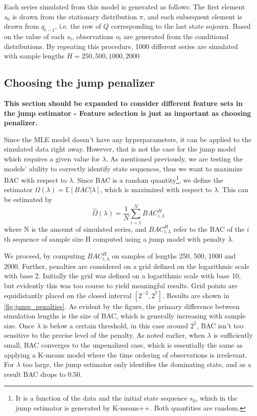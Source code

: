 Each series simulated from this model is generated as follows: The first element $s_0$ is drawn from the stationary distribution $\pi$, and each subsequent element is drawn from $q_{t-1}$, i.e. the row of $Q$ corresponding to the last state sojourn. Based on the value of each $s_t$, observations $o_t$ are generated from the conditional distributions. By repeating this procedure, 1000 different series are simulated with sample lengths $H = 250, 500, 1000, 2000$

\subsection{Choosing the jump penalizer}
\label{subsection: jump_penalizer}

\textbf{This section should be expanded to consider different feature sets in the jump estimator - Feature selection is just as important as choosing penalizer.}

Since the MLE model doesn't have any hyperparameters, it can be applied to the simulated data right away. However, that is not the case for the jump model which requires a given value for $\lambda$. As mentioned previously, we are testing the models' ability to correctly identify state sequences, thus we want to maximize BAC with respect to $\lambda$. Since BAC is a random quantity\footnote
{It is a function of the data and the initial state sequence $s_0$, which in the jump estimator is generated by K-means++. Both quantities are random.
},
we define the estimator $\Omega(\lambda)= \mathbb{E}[BAC|\lambda]$, which is maximized with respect to $\lambda$. This can be estimated by 
\begin{equation}
    \hat\Omega(\lambda) = \frac{1}{N} \sum_{i=1}^N BAC_{i, \lambda}^H
\end{equation}
where N is the amount of simulated series, and $BAC_{i, \lambda}^H$ refer to the BAC of the $i$th sequence of sample size H computed using a jump model with penalty $\lambda$.

We proceed, by computing $BAC_{i, \lambda}^H$ on samples of lengths 250, 500, 1000 and 2000. Further, penalties are considered on a grid defined on the logarithmic scale with base 2. Initially the grid was defined on a logarithmic scale with base 10, but evidently this was too course to yield meaningful results. Grid points are equidistantly placed on the closed interval $[2^{-2}, 2^{7}]$. Results are shown in \cref{fig:jump_penalties}. As evident by the figure, the primary difference between simulation lengths is the size of BAC, which is generally increasing with sample size. Once $\lambda$ is below a certain threshold, in this case around $2^5$, BAC isn't too sensitive to the precise level of the penalty. As noted earlier, when $\lambda$ is sufficiently small, BAC converges to the unpenalized case, which is essentially the same as applying a K-means model where the time ordering of observations is irrelevant. For $\lambda$ too large, the jump estimator only identifies the dominating state, and as a result BAC drops to 0.50. 

